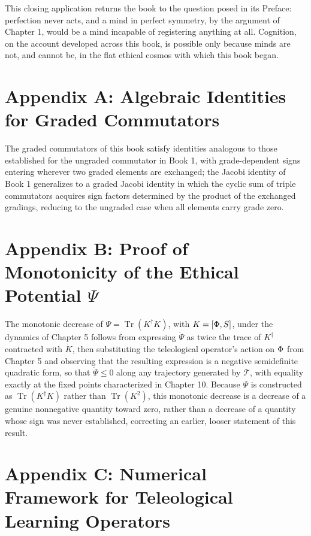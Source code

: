 This closing application returns the book to the question posed in its Preface: perfection never acts, and a mind in perfect symmetry, by the argument of Chapter 1, would be a mind incapable of registering anything at all. Cognition, on the account developed across this book, is possible only because minds are not, and cannot be, in the flat ethical cosmos with which this book began.

\chapter*{Appendix A: Algebraic Identities for Graded Commutators}

The graded commutators of this book satisfy identities analogous to those established for the ungraded commutator in Book 1, with grade-dependent signs entering wherever two graded elements are exchanged; the Jacobi identity of Book 1 generalizes to a graded Jacobi identity in which the cyclic sum of triple commutators acquires sign factors determined by the product of the exchanged gradings, reducing to the ungraded case when all elements carry grade zero.

\chapter*{Appendix B: Proof of Monotonicity of the Ethical Potential $\Psi$}

The monotonic decrease of $\Psi = \operatorname{Tr}(K^{\dagger}K)$, with $K = [\Phi, S]$, under the dynamics of Chapter 5 follows from expressing $\dot{\Psi}$ as twice the trace of $K^{\dagger}$ contracted with $\dot{K}$, then substituting the teleological operator's action on $\Phi$ from Chapter 5 and observing that the resulting expression is a negative semidefinite quadratic form, so that $\dot{\Psi} \le 0$ along any trajectory generated by $\mathcal{T}$, with equality exactly at the fixed points characterized in Chapter 10. Because $\Psi$ is constructed as $\operatorname{Tr}(K^\dagger K)$ rather than $\operatorname{Tr}(K^2)$, this monotonic decrease is a decrease of a genuine nonnegative quantity toward zero, rather than a decrease of a quantity whose sign was never established, correcting an earlier, looser statement of this result.

\chapter*{Appendix C: Numerical Framework for Teleological Learning Operators}

